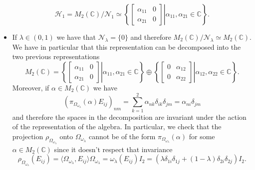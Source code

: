\begin{example}
\begin{itemize}
\begin{equation}
\mathcal{H}_1=M_2(\mathbb{C})/\mathcal{N}_1\simeq\left\{\left.\begin{bmatrix}
\alpha_{11} & 0 \\
\alpha_{21} & 0
\end{bmatrix}\right|\alpha_{11},\alpha_{21}\in\mathbb{C}\right\}.
\end{equation}
\item If $\lambda \in(0,1)$ we have that $\mathcal{N}_\lambda = \{0\}$ and therefore $M_2(\mathbb{C})/\mathcal{N}_\lambda \simeq M_2(\mathbb{C})$. We have in particular that this representation can be decomposed into the two previous representations
\begin{equation}
M_2(\mathbb{C})=\left\{\left.\begin{bmatrix}
\alpha_{11} & 0 \\
\alpha_{21} & 0
\end{bmatrix}\right|\alpha_{11},\alpha_{21}\in\mathbb{C}\right\}\oplus\left\{\left.\begin{bmatrix}
0 & \alpha_{12} \\
0 & \alpha_{22}
\end{bmatrix}\right|\alpha_{12},\alpha_{22}\in\mathbb{C}\right\}.
\end{equation} 
Moreover, if $\alpha \in M_2(\mathbb{C})$ we have
\begin{equation}
(\pi_{\Omega_{\omega_\lambda}}(\alpha)E_{ij})_{nm}=\sum_{k=1}^2\alpha_{nk}\delta_{ik}\delta_{jm}=\alpha_{ni}\delta_{jm}
\end{equation}
and therefore the spaces in the decomposition are invariant under the action of the representation of the algebra. In particular, we check that the projection $\rho_{\Omega_{\omega_\lambda}}$ onto $\Omega_{\omega_\lambda}$ cannot be of the form $\pi_{\Omega_{\omega_\lambda}}(\alpha)$ for some $\alpha\in M_2(\mathbb{C})$ since it doesn't respect that invariance
\begin{equation}
\rho_{\Omega_{\omega_\lambda}}(E_{ij})=\langle \Omega_{\omega_\lambda}, E_{ij}\rangle\Omega_{\omega_\lambda} = \omega_\lambda(E_{ij})I_2=(\lambda\delta_{1i}\delta_{1j}+(1-\lambda)\delta_{2i}\delta_{2j})I_2.
\end{equation} 
\end{itemize}
\end{example}

